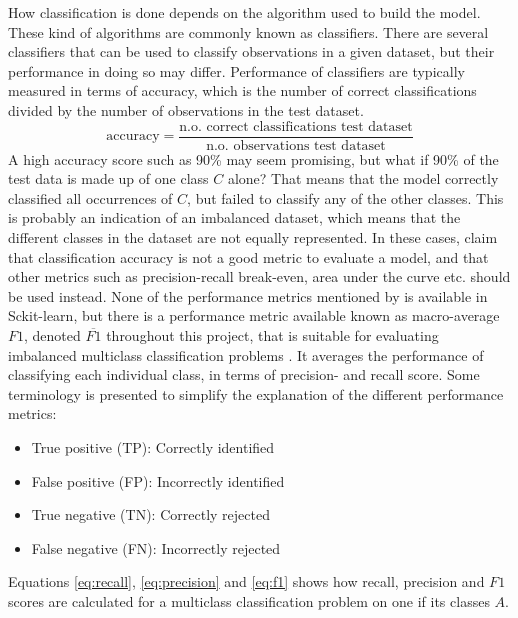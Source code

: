 	
	How classification is done depends on the algorithm used to build the model. These kind of algorithms are commonly known as classifiers. There are several classifiers that can be used to classify observations in a given dataset, but their performance in doing so may differ. Performance of classifiers are typically measured in terms of accuracy, which is the number of correct classifications divided by the number of observations in the test dataset.
\begin{equation}
	\mbox{accuracy} = \frac{\mbox{n.o. correct classifications test dataset}}{\mbox{n.o. observations test dataset}}
\end{equation}
	A high accuracy score such as 90\% may seem promising, but what if 90\% of the test data is made up of one class $C$ alone? That means that the model correctly classified all occurrences of $C$, but failed to classify any of the other classes. This is probably an indication of an imbalanced dataset, which means that the different classes in the dataset are not equally represented. In these cases, \cite{BOOK:11} claim that classification accuracy is not a good metric to evaluate a model, and that other metrics such as precision-recall break-even, area under the curve etc. should be used instead. None of the performance metrics mentioned by \cite{BOOK:11} is available in Sckit-learn, but there is a performance metric available known as macro-average $F1$, denoted $\overline{F1}$ throughout this project, that is suitable for evaluating imbalanced multiclass classification problems \cite{WEBSITE:25}. It averages the performance of classifying each individual class, in terms of precision- and recall score. Some terminology is presented to simplify the explanation of the different performance metrics: 
	\begin{itemize}
		\item{True positive (TP):} Correctly identified 
		\item{False positive (FP):} Incorrectly identified
		\item{True negative (TN):} Correctly rejected
		\item{False negative (FN):} Incorrectly rejected
	\end{itemize}
Equations \ref{eq:recall}, \ref{eq:precision} and \ref{eq:f1} shows how recall, precision and $F1$ scores are calculated for a multiclass classification problem on one if its classes $A$. 

